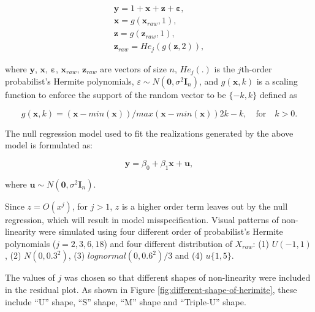 \documentclass[]{interact}
\theoremstyle{plain}%
\theoremstyle{definition}
\theoremstyle{remark}
\begin{document}
\begin{align} \label{eq:nonlinearity-model}
\boldsymbol{y} = 1 + \boldsymbol{x} + \boldsymbol{z} + \boldsymbol{\varepsilon},\\
\boldsymbol{x} = g(\boldsymbol{x}_{raw}, 1), \\
\boldsymbol{z} = g(\boldsymbol{z}_{raw}, 1), \\
\boldsymbol{z}_{raw} = He_j(g(\boldsymbol{z}, 2)),
\end{align}

where \(\boldsymbol{y}\), \(\boldsymbol{x}\),
\(\boldsymbol{\varepsilon}\), \(\boldsymbol{x}_{raw}\),
\(\boldsymbol{z}_{raw}\) are vectors of size \(n\), \(He_{j}(.)\) is the
\(j\)th-order probabilist's Hermite polynomials,
\(\varepsilon \sim N(\boldsymbol{0}, \sigma^2\boldsymbol{I}_n)\), and
\(g(\boldsymbol{x}, k)\) is a scaling function to enforce the support of
the random vector to be \(\{-k, k\}\) defined as

\begin{equation} \label{eq:scaling-function}
g(\boldsymbol{x}, k) = (\boldsymbol{x} - min(\boldsymbol{x}))/max(\boldsymbol{x} - min(\boldsymbol{x}))2k - k, \quad \text{for} \quad k > 0. 
\end{equation}

The null regression model used to fit the realizations generated by the
above model is formulated as:

\begin{equation} \label{eq:null-model}
\boldsymbol{y} = \beta_0 + \beta_1 \boldsymbol{x} + \boldsymbol{u},
\end{equation}

where
\(\boldsymbol{u} \sim N(\boldsymbol{0}, \sigma^2\boldsymbol{I}_n)\).

Since \(z = O(x^j)\), for \(j > 1\), \(z\) is a higher order term leaves
out by the null regression, which will result in model misspecification.
Visual patterns of non-linearity were simulated using four different
order of probabilist's Hermite polynomials (\(j = 2, 3, 6, 18\)) and
four different distribution of \(X_{raw}\): (1) \(U(-1, 1)\), (2)
\(N(0, 0.3^2)\), (3) \(lognormal(0, 0.6^2)/3\) and (4) \(u\{1, 5\}\).

The values of \(j\) was chosen so that different shapes of non-linearity
were included in the residual plot. As shown in Figure
\ref{fig:different-shape-of-herimite}, these include ``U'' shape, ``S''
shape, ``M'' shape and ``Triple-U'' shape.
\end{document}

